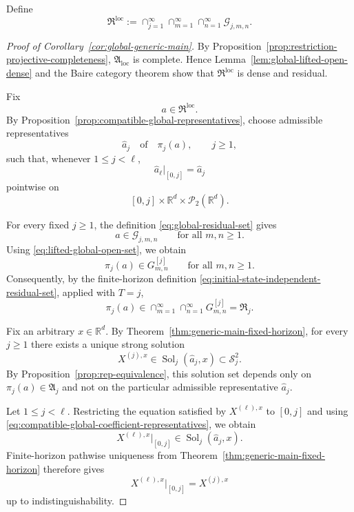 \documentclass[12pt,oneside, reqno]{amsart}
\numberwithin{equation}{section}
\begin{document}
	Define
	\begin{equation}
		\label{eq:global-residual-set}
		\mathfrak R^{\mathrm{loc}}
		:=
		\cap_{j=1}^{\infty}
		\cap_{m=1}^{\infty}
		\cap_{n=1}^{\infty}
		\mathcal G_{j,m,n}.
	\end{equation}
	
	\begin{proof}[Proof of Corollary~\ref{cor:global-generic-main}]
		By Proposition~\ref{prop:restriction-projective-completeness},
		$\mathfrak A_{\mathrm{loc}}$ is complete. Hence
		Lemma~\ref{lem:global-lifted-open-dense} and the Baire category
		theorem show that $\mathfrak R^{\mathrm{loc}}$ is dense and
		residual.
		
		Fix
		\[
		a\in\mathfrak R^{\mathrm{loc}}.
		\]
		By Proposition~\ref{prop:compatible-global-representatives}, choose
		admissible representatives
		\[
		\widehat a_j
		\quad\text{of}\quad
		\pi_j(a),
		\qquad j\geq1,
		\]
		such that, whenever $1\leq j<\ell$,
		\begin{equation}
			\label{eq:compatible-global-coefficient-representatives}
			\widehat a_\ell|_{[0,j]}=\widehat a_j
		\end{equation}
		pointwise on
		\[
		[0,j]\times\mathbb R^d\times\mathcal P_2(\mathbb R^d).
		\]
		
		For every fixed $j\geq1$, the definition
		\eqref{eq:global-residual-set} gives
		\[
		a\in\mathcal G_{j,m,n}
		\qquad
		\text{for all }m,n\geq1.
		\]
		Using \eqref{eq:lifted-global-open-set}, we obtain
		\[
		\pi_j(a)\in G_{m,n}^{[j]}
		\qquad
		\text{for all }m,n\geq1.
		\]
		Consequently, by the finite-horizon definition
		\eqref{eq:initial-state-independent-residual-set}, applied with
		$T=j$,
		\begin{equation}
			\label{eq:global-projection-in-finite-residual-set}
			\pi_j(a)
			\in
			\cap_{m=1}^{\infty}
			\cap_{n=1}^{\infty}
			G_{m,n}^{[j]}
			=
			\mathfrak R_j.
		\end{equation}
		
		Fix an arbitrary $x\in\mathbb R^d$. By
		Theorem~\ref{thm:generic-main-fixed-horizon}, for every $j\geq1$
		there exists a unique strong solution
		\[
		X^{(j),x}
		\in
		\operatorname{Sol}_j(\widehat a_j,x)
		\subset
		\mathcal S_j^2.
		\]
		By Proposition~\ref{prop:rep-equivalence}, this solution set depends
		only on $\pi_j(a)\in\mathfrak A_j$ and not on the particular
		admissible representative $\widehat a_j$.
		
		Let $1\leq j<\ell$. Restricting the equation satisfied by
		$X^{(\ell),x}$ to $[0,j]$ and using
		\eqref{eq:compatible-global-coefficient-representatives}, we obtain
		\[
		X^{(\ell),x}|_{[0,j]}
		\in
		\operatorname{Sol}_j(\widehat a_j,x).
		\]
		Finite-horizon pathwise uniqueness from
		Theorem~\ref{thm:generic-main-fixed-horizon} therefore gives
		\begin{equation}
			\label{eq:compatible-global-solutions-all-initial}
			X^{(\ell),x}|_{[0,j]}=X^{(j),x}
		\end{equation}
		up to indistinguishability.
		

\end{proof}
\end{document}
